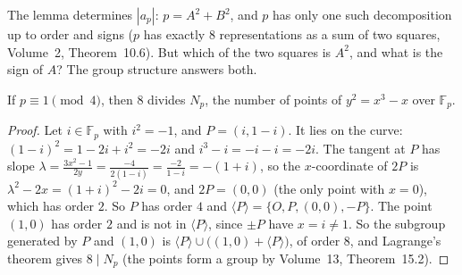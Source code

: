 The lemma determines $|a_p|$: $p=A^2+B^2$, and $p$ has only one such decomposition up to order and signs ($p$ has exactly $8$ representations as a sum of two
squares, Volume~2, Theorem~10.6). But which of the two squares is $A^2$, and what is the sign of $A$? The group structure answers both.

\begin{lemma}\label{conjectures:lem:eightdiv}
If $p\equiv1\pmod4$, then $8$ divides $N_p$, the number of points of $y^2=x^3-x$ over $\mathbb F_p$.
\end{lemma}
\begin{proof}
Let $i\in\mathbb F_p$ with $i^2=-1$, and $P=(i,1-i)$. It lies on the curve: $(1-i)^2=1-2i+i^2=-2i$ and $i^3-i=-i-i=-2i$. The tangent at $P$ has slope
$\lambda=\frac{3x^2-1}{2y}=\frac{-4}{2(1-i)}=\frac{-2}{1-i}=-(1+i)$, so the $x$-coordinate of $2P$ is $\lambda^2-2x=(1+i)^2-2i=0$, and $2P=(0,0)$
(the only point with $x=0$), which has order $2$. So $P$ has order $4$ and $\langle P\rangle=\{O,P,(0,0),-P\}$. The point $(1,0)$ has order $2$ and is not
in $\langle P\rangle$, since $\pm P$ have $x=i\ne1$. So the subgroup generated by $P$ and $(1,0)$ is $\langle P\rangle\cup\bigl((1,0)+\langle P\rangle\bigr)$,
of order $8$, and Lagrange's theorem gives $8\mid N_p$ (the points form a group by Volume~13, Theorem~15.2).
\end{proof}

